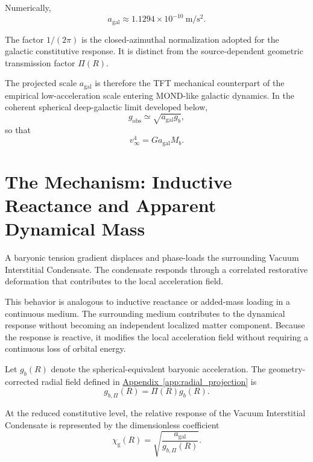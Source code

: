 Numerically,
\begin{equation}
    \boxed{
    a_{\mathrm{gal}}
    \approx
    1.1294\times10^{-10}\ \mathrm{m/s^2}.
    }
\end{equation}

The factor $1/(2\pi)$ is the closed-azimuthal normalization adopted for the
galactic constitutive response. It is distinct from the source-dependent
geometric transmission factor $\Pi(R)$.

The projected scale $a_{\mathrm{gal}}$ is therefore the TFT mechanical
counterpart of the empirical low-acceleration scale entering MOND-like galactic
dynamics. In the coherent spherical deep-galactic limit developed below,
\begin{equation}
    g_{\mathrm{obs}}
    \simeq
    \sqrt{
        a_{\mathrm{gal}}g_b
    },
\end{equation}
so that
\begin{equation}
    v_{\infty}^{4}
    =
    G
    a_{\mathrm{gal}}
    M_b.
\end{equation}

\section{The Mechanism: Inductive Reactance and Apparent Dynamical Mass}

A baryonic tension gradient displaces and phase-loads the surrounding Vacuum Interstitial Condensate. The condensate responds through a correlated restorative deformation that contributes to the local acceleration field.

This behavior is analogous to inductive reactance or added-mass loading in a continuous medium. The surrounding medium contributes to the dynamical response without becoming an independent localized matter component. Because the response is reactive, it modifies the local acceleration field without requiring a continuous loss of orbital energy.

Let $g_b(R)$ denote the spherical-equivalent baryonic acceleration. The geometry-corrected radial field defined in \hyperref[app:radial_projection]{Appendix~\ref*{app:radial_projection}} is
\begin{equation}
    g_{b,\Pi}(R) = \Pi(R)g_b(R).
\end{equation}

At the reduced constitutive level, the relative response of the Vacuum Interstitial Condensate is represented by the dimensionless coefficient
\begin{equation}
    \chi_{\mathrm{g}}(R) = \sqrt{ \frac{a_{\mathrm{gal}}}{g_{b,\Pi}(R)} }.
\end{equation}


